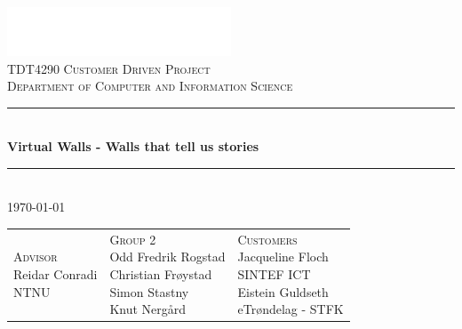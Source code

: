 \documentclass[11pt]{book}
\begin{document}
\newcommand{\fullprojectname}[0]{Virtual Walls - Walls that tell us stories}
\newcommand{\shortprojectname}[0]{Virtual Walls }
\newcommand{\systemname}[0]{StedR }
\newcommand{\wallentitys}[0]{place }
\newcommand{\wallentityp}[0]{places }
\newcommand{\wallentitypcap}[0]{Places }

\frontmatter

\begin{titlepage}
    \color{white}
    \begin{center}
        ~
        \\[-2.5cm]

        \includegraphics[width=0.5\textwidth]{images/ntnu_logo}
        \\[0.4cm]
        \textsc{\Large TDT4290 Customer Driven Project\\
        Department of Computer and Information Science}
        \\[0.5cm]
        
        \rule{\linewidth}{0.5mm}
        \\[1cm]
        
        \textbf{\LARGE \fullprojectname}
        \\[0.8cm]
        
        \rule{\linewidth}{0.5mm}
        \\[1.0cm]
        
        \Large{  \today}
        \\[1.3cm]

\begin{table}[H]
\centering
\begin{tabular}{ p{4cm} p{5cm} p{4cm} }
\parbox{4cm}{
\centering
    \color{white}
        \textsc{\Large Advisor}
        \\[0.1cm]
        \Large
        {
            Reidar Conradi\\
             \small{NTNU}
        }
} & \parbox{5cm}{
\centering
    \color{white}
        \textsc{\Large Group 2}
        \\[0.1cm]
        \Large
        {
            Odd Fredrik Rogstad \\
            Christian Frøystad \\
            Simon Stastny \\
            Knut Nergård
        }
} & \parbox{4cm}{
\centering
    \color{white}
        \textsc{\Large Customers}
        \\[0.1cm]
        \Large
        {
            Jacqueline Floch\\
            \small{SINTEF ICT}\\
            \Large{Eistein Guldseth}\\
            \small{eTrøndelag - STFK}\\
        }
}
\end{tabular}
\end{table}
        


\end{center}
\end{titlepage}
\end{document}
